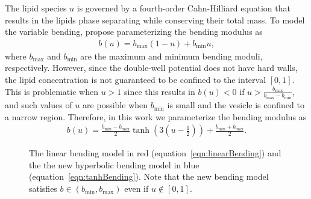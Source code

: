 \documentclass[twoside,twocolumn,9pt]{article}
\begin{document}
The lipid species $u$ is governed by a fourth-order Cahn-Hilliard equation that results in the lipids phase separating while conserving their total mass. To model the variable bending, \citet{soh-tse-li-voi-low2010} propose parameterizing the bending modulus as
\begin{align}
    b(u) = b_{\max} (1-u) + b_{\min} u,
    \label{eqn:linearBending}
\end{align}
where $b_{\max}$ and $b_{\min}$ are the maximum and minimum bending moduli, respectively. However, since the double-well potential does not have hard walls, the lipid concentration is not guaranteed to be confined to the interval $[0,1]$. This is problematic when $u > 1$ since this results in $b(u) < 0$ if $u > \frac{b_{\max}}{b_{\max} - b_{\min}}$, and such values of $u$ are possible when $b_{\min}$ is small and the vesicle is confined to a narrow region. Therefore, in this work we parameterize the bending modulus as
\begin{align}
    b(u) = \frac{b_{\min} - b_{\max}}{2} \tanh\left(3\left(u - \frac{1}{2} \right)\right) + 
           \frac{b_{\min} + b_{\max}}{2}.
    \label{eqn:tanhBending}
\end{align}
\begin{figure}[H]
    \centering
    
    \caption{\label{fig:concModels} \small The linear bending model in red (equation~\eqref{eqn:linearBending}) and the the new hyperbolic bending model in blue (equation~\eqref{eqn:tanhBending}). Note that the new bending model satisfies $b \in (b_{\min},b_{\max})$ even if $u \notin [0,1]$.}
\end{figure}
\end{document}

